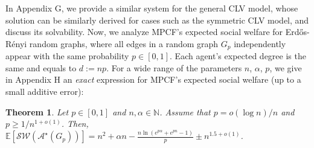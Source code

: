\documentclass[letterpaper]{article} %
\newtheorem{theorem}{Theorem}
\begin{document}
In Appendix G, we provide a similar system for the general CLV model, whose solution can be similarly derived for cases such as the symmetric CLV model, and discuss its solvability. Now, we analyze MPCF's expected social welfare for Erd\H{o}s-R\'{e}nyi random graphs, where all edges in a random graph $G_p$ independently appear with the same probability $p \in [0,1]$. Each agent's expected degree is the same and equals to $d := np$. For a wide range of the parameters $n$, $\alpha$, $p$, we give in Appendix H an \textit{exact} expression for MPCF's expected social welfare (up to a small additive error):
\begin{theorem}    
    \label{thm:expected sw for erdos}
    Let ${p} \in [0,1]$ and $n, \alpha \in \mathbb{N}$. Assume that $p = o(\log n)/n$ and $p \geq 1/ n^{1+o(1)}$. Then, %
    $\mathbb{E}[\mathcal{SW}(\mathcal{A}^\star(G_{{p}}))] = n^2 + \alpha n - \frac{n \ln (e^{p\alpha} + e^{pn} - 1 ) }{p} \pm n^{1.5 + o(1)}$.
\end{theorem}


\end{document}
